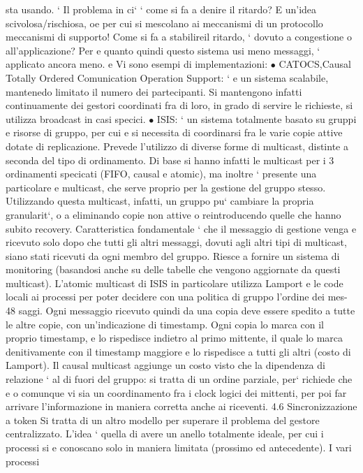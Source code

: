 \documentclass[a4paper,12pt]{article}
\begin{document}
sta usando.
`
Il problema in ci` ` come si fa a denire il ritardo? E un'idea scivolosa/rischiosa,
oe
per cui si mescolano ai meccanismi di un protocollo meccanismi di supporto!
Come si fa a stabilireil ritardo, ` dovuto a congestione o all'applicazione? Per
e
quanto quindi questo sistema usi meno messaggi, ` applicato ancora meno.
e
Vi sono esempi di implementazioni:
$\bullet$ CATOCS,Causal Totally Ordered Comunication Operation Support: `
e
un sistema scalabile, mantenedo limitato il numero dei partecipanti. Si
mantengono infatti continuamente dei gestori coordinati fra di loro, in
grado di servire le richieste, si utilizza broadcast in casi specici.
$\bullet$ ISIS: ` un sistema totalmente basato su gruppi e risorse di gruppo, per cui
e
si necessita di coordinarsi fra le varie copie attive dotate di replicazione.
Prevede l'utilizzo di diverse forme di multicast, distinte a seconda del tipo
di ordinamento. Di base si hanno infatti le multicast per i 3 ordinamenti
specicati (FIFO, causal e atomic), ma inoltre ` presente una particolare
e
multicast, che serve proprio per la gestione del gruppo stesso. Utilizzando
questa multicast, infatti, un gruppo pu` cambiare la propria granularit`,
o
a
eliminando copie non attive o reintroducendo quelle che hanno subito recovery. Caratteristica fondamentale ` che il
messaggio di gestione venga
e
ricevuto solo dopo che tutti gli altri messaggi, dovuti agli altri tipi di multicast, siano stati ricevuti da ogni
membro del gruppo. Riesce a fornire
un sistema di monitoring (basandosi anche su delle tabelle che vengono
aggiornate da questi multicast).
L'atomic multicast di ISIS in particolare utilizza Lamport e le code locali
ai processi per poter decidere con una politica di gruppo l'ordine dei mes-
48
saggi. Ogni messaggio ricevuto quindi da una copia deve essere spedito a
tutte le altre copie, con un'indicazione di timestamp. Ogni copia lo marca con il proprio timestamp, e lo rispedisce
indietro al primo mittente, il
quale lo marca denitivamente con il timestamp maggiore e lo rispedisce
a tutti gli altri (costo di Lamport).
Il causal multicast aggiunge un costo visto che la dipendenza di relazione
` al di fuori del gruppo: si tratta di un ordine parziale, per` richiede che
e
o
comunque vi sia un coordinamento fra i clock logici dei mittenti, per poi
far arrivare l'informazione in maniera corretta anche ai riceventi.
4.6
Sincronizzazione a token
Si tratta di un altro modello per superare il problema del gestore centralizzato. L'idea ` quella di avere un anello
totalmente ideale, per cui i processi si
e
conoscano solo in maniera limitata (prossimo ed antecedente). I vari processi
\end{document}
